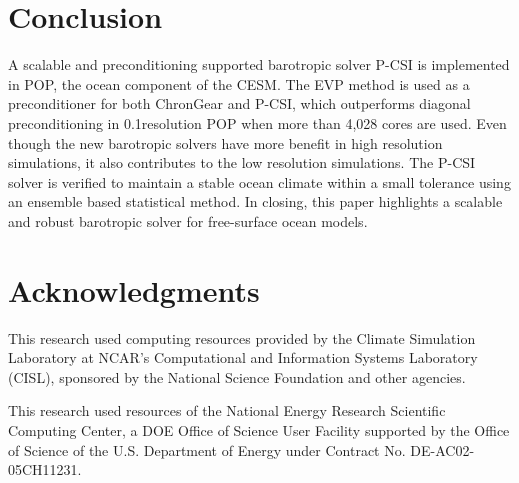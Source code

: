 \documentclass{sig-alternate}
\begin{document}
\section{Conclusion} \label{se:conc}
A scalable and preconditioning supported barotropic solver P-CSI is implemented in POP, the ocean component of the CESM.
The EVP method is used as a preconditioner for both ChronGear and P-CSI, which outperforms diagonal preconditioning in 0.1\degree resolution POP when more than 4,028 cores are used. 
Even though the new barotropic solvers have more benefit in high resolution simulations,
it also contributes to the low resolution simulations. 
The P-CSI solver is verified to maintain a stable ocean climate within a small tolerance using an ensemble based statistical method.
In closing, this paper highlights a scalable and robust barotropic solver for free-surface ocean models.

\section{Acknowledgments}
This research used computing resources provided by the Climate Simulation Laboratory at NCAR's Computational and Information Systems Laboratory (CISL), sponsored by the National Science Foundation and other agencies.

This research used resources of the National Energy Research Scientific Computing Center, a DOE Office of Science User Facility supported by the Office of Science of the U.S. Department of Energy under Contract No. DE-AC02-05CH11231.

\end{document}
